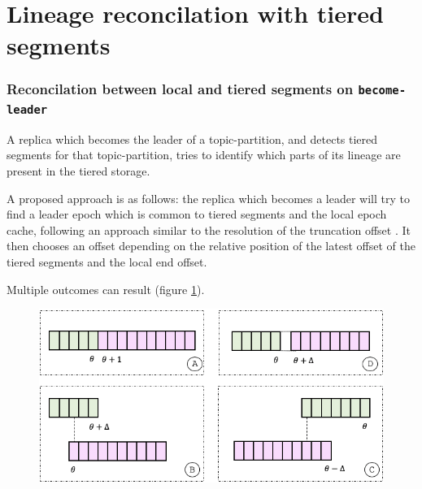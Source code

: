 \documentclass{article}
\begin{document}
\newpage
\section{Lineage reconcilation with tiered segments}

\subsubsection{Reconcilation between local and tiered segments on \texttt{become-leader}}

A replica which becomes the leader of a topic-partition, and detects tiered segments for that topic-partition, tries to identify which parts of its lineage are present in the tiered storage. 

A proposed approach is as follows: the replica which becomes a leader will try to find a leader epoch which is common to tiered segments and the local epoch cache, following an approach similar to the resolution of the truncation offset \cite{KIP279}. It then chooses an offset depending on the relative position of the latest offset of the tiered segments and the local end offset.

Multiple outcomes can result (figure \ref{fig:become-leader}).

\begin{figure}[h!]
	\centering
	\includegraphics[scale=0.6]{become-leader.png}
	\label{fig:become-leader}
\end{figure}
\end{document}
